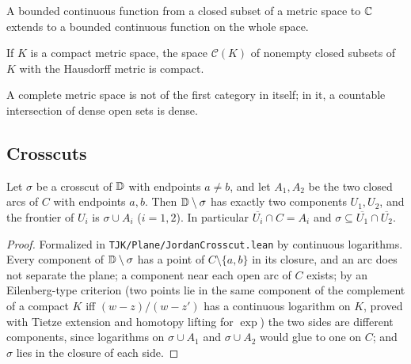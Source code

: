 \begin{fact}\label{fact:tietze-ext}
A bounded continuous function from a closed subset of a metric space to $\mathbb{C}$ extends to a bounded continuous function on the
whole space.
\end{fact}

\begin{fact}[hyperspace]\label{fact:hyperspace}
If $K$ is a compact metric space, the space $\mathcal C(K)$ of nonempty closed subsets of $K$ with the Hausdorff metric is
compact.
\end{fact}

\begin{fact}\label{fact:baire-category}
A complete metric space is not of the first category in itself; in it, a countable intersection of dense open sets is dense.
\end{fact}

\subsection{Crosscuts}

\begin{theorem}\label{fact:crosscut}
Let $\sigma$ be a crosscut of $\mathbb{D}$ with endpoints $a\ne b$, and let $A_1,A_2$ be the two closed arcs of
$C$ with endpoints $a,b$. Then $\mathbb{D}\setminus\sigma$ has exactly two components $U_1,U_2$, and the frontier
of $U_i$ is $\sigma\cup A_i$ ($i=1,2$). In particular $\overline{U_i}\cap C=A_i$ and
$\sigma\subseteq\overline{U_1}\cap\overline{U_2}$.
\end{theorem}
\begin{proof}
Formalized in \texttt{TJK/Plane/JordanCrosscut.lean} by continuous logarithms. Every component of $\mathbb{D}\setminus\sigma$ has a point
of $C\setminus\{a,b\}$ in its closure, and an arc does not separate the plane; a component near each open arc of $C$ exists;
by an Eilenberg-type criterion (two points lie in the same component of the complement of a compact $K$ iff
$(w-z)/(w-z')$ has a continuous logarithm on $K$, proved with Tietze extension and homotopy lifting for $\exp$) the two
sides are different components, since logarithms on $\sigma\cup A_1$ and $\sigma\cup A_2$ would glue to one on $C$; and
$\sigma$ lies in the closure of each side.
\end{proof}

